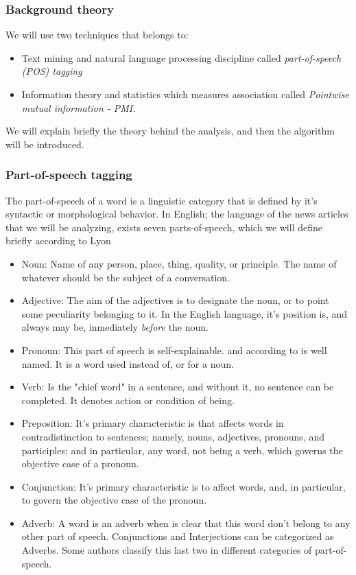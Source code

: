 \subsubsection{Background theory}\label{backgroundTheory}
We will use two techniques that belongs to:
	\begin{itemize}
		\item Text mining and natural language processing discipline called \emph{part-of-speech (POS) tagging}
		\item Information theory and statistics which measures association called \emph{Pointwise mutual information - PMI.}
	\end{itemize}

We will explain briefly the theory behind the analysis, and then the algorithm will be introduced.

\subsubsection{Part-of-speech tagging}\label{partOfSpeech}

The part-of-speech of a word is a linguistic category that is defined by it's syntactic or morphological behavior. In English; the language of the news articles that we will be analyzing, exists seven parts-of-speech, which we will define briefly according to Lyon \cite[p. 18-69]{L1832}

	\begin{itemize}
		\item Noun: Name of any person, place, thing, quality, or principle. The name of whatever should be the subject of a conversation.
		\item Adjective: The aim of the adjectives is to designate the noun, or to point some peculiarity belonging to it. In the English language, it's position is, and always may be, inmediately \emph{before} the noun.
		\item Pronoun: This part of speech is self-explainable. and according to \cite[][p.~31]{L1832}  is well named. It is a word used instead of, or for a noun.
		\item Verb: Is the "chief word" in a sentence, and without it, no sentence can be completed. It denotes action or condition of being.
		\item Preposition: It's primary characteristic is that affects words in contradistinction to sentences; namely, nouns, adjectives, pronouns, and participles; and in particular, any word, not being a verb, which governs the objective case of a pronoun.
		\item Conjunction: It's primary characteristic is to affect words, and, in particular, to govern the objective case of the pronoun.
		\item Adverb: A word is an adverb when is clear that this word don't belong to any other part of speech. Conjunctions and Interjections can be categorized as Adverbs. Some authors classify this last two in different categories of part-of-speech.
	\end{itemize}
	

